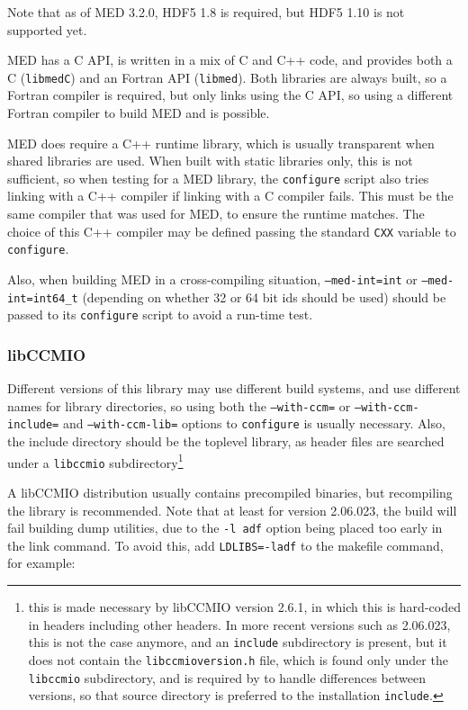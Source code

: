 \documentclass[a4paper,10pt,twoside]{csshortdoc}
\begin{document}
Note that as of MED 3.2.0, HDF5 1.8 is required, but HDF5 1.10 is
not supported yet.

MED has a C API, is written in a mix of C and C++ code,
and provides both a C (\texttt{libmedC}) and an Fortran API
(\texttt{libmed}). Both libraries are always built, so a Fortran
compiler is required, but \CS only links using the C API, so using
a different Fortran compiler to build MED and \CS is possible.

MED does require a C++ runtime library, which is usually transparent
when shared libraries are used. When built with static libraries
only, this is not sufficient, so when testing for a MED library,
the \CS \texttt{configure} script also tries linking with a C++
compiler if linking with a C compiler fails. This must be the
same compiler that was used for MED, to ensure the runtime matches.
The choice of this C++ compiler may be defined passing the
standard \texttt{CXX} variable to \texttt{configure}.

Also, when building MED in a cross-compiling situation,
\texttt{--med-int=int} or \texttt{--med-int=int64\_t} (depending
on whether 32 or 64 bit ids should be used) should be
passed to its \texttt{configure} script to avoid a run-time
test.

\subsubsection{libCCMIO\label{sec:ext:libccmio}}

Different versions of this library may use different build
systems, and use different names for library directories,
so using both the \texttt{--with-ccm=} or \texttt{--with-ccm-include=}
and \texttt{--with-ccm-lib=} options to \texttt{configure} is
usually necessary.
Also, the include directory should be the toplevel library,
as header files are searched under a \texttt{libccmio}
subdirectory\footnote{this is made necessary by libCCMIO version
2.6.1, in which this is hard-coded in headers including other
headers. In more recent versions such as 2.06.023, this is not the
case anymore, and an \texttt{include} subdirectory is present, but
it does not contain the \texttt{libccmioversion.h} file, which is
found only under the \texttt{libccmio} subdirectory, and is required
by \CS to handle differences between versions, so that source
directory is preferred to the installation \texttt{include}.}

A libCCMIO distribution usually contains precompiled
binaries, but recompiling the library is recommended.
Note that at least for version 2.06.023, the build will fail
building dump utilities, due to the \texttt{-l adf} option
being placed too early in the link command. To avoid this,
add \texttt{LDLIBS=-ladf} to the makefile command, for example:
\end{document}
